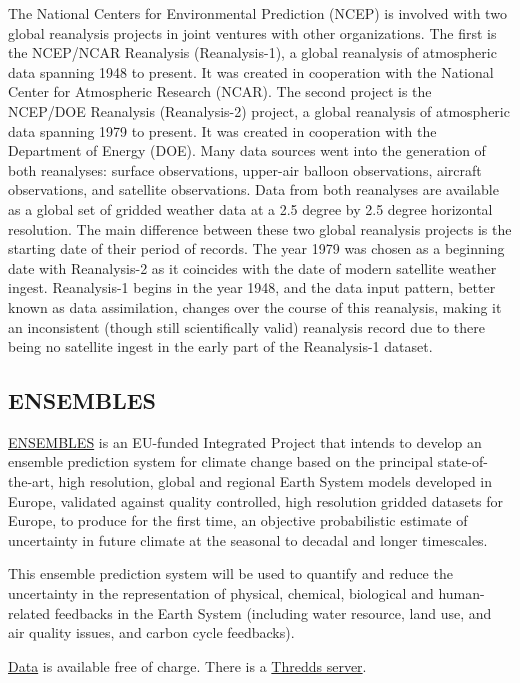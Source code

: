 \documentclass[11pt]{article}
\begin{document}
The National Centers for Environmental Prediction (NCEP) is
involved with two global reanalysis projects in joint ventures
with other organizations. The first is the NCEP/NCAR Reanalysis
(Reanalysis-1), a global reanalysis of atmospheric data spanning
1948 to present. It was created in cooperation with the National
Center for Atmospheric Research (NCAR). The second project is the
NCEP/DOE Reanalysis (Reanalysis-2) project, a global reanalysis of
atmospheric data spanning 1979 to present. It was created in
cooperation with the Department of Energy (DOE). Many data sources
went into the generation of both reanalyses: surface observations,
upper-air balloon observations, aircraft observations, and
satellite observations. Data from both reanalyses are available as
a global set of gridded weather data at a 2.5 degree by 2.5 degree
horizontal resolution. The main difference between these two
global reanalysis projects is the starting date of their period of
records. The year 1979 was chosen as a beginning date with
Reanalysis-2 as it coincides with the date of modern satellite
weather ingest. Reanalysis-1 begins in the year 1948, and the data
input pattern, better known as data assimilation, changes over the
course of this reanalysis, making it an inconsistent (though still
scientifically valid) reanalysis record due to there being no
satellite ingest in the early part of the Reanalysis-1 dataset.

\subsection{ENSEMBLES}
\label{sec-3-2}

\href{//old.ecmwf.int/research/EU_projects/ENSEMBLES/index.html}{ENSEMBLES} is an EU-funded Integrated Project that intends to
develop an ensemble prediction system for climate change based on
the principal state-of-the-art, high resolution, global and
regional Earth System models developed in Europe, validated
against quality controlled, high resolution gridded datasets for
Europe, to produce for the first time, an objective probabilistic
estimate of uncertainty in future climate at the seasonal to
decadal and longer timescales.

This ensemble prediction system will be used to quantify and
reduce the uncertainty in the representation of physical,
chemical, biological and human-related feedbacks in the Earth
System (including water resource, land use, and air quality
issues, and carbon cycle feedbacks). 

\href{http://old.ecmwf.int/research/EU_projects/ENSEMBLES/data/data_dissemination.htmlhttp://www.ecmwf.int/research/EU_projects/ENSEMBLES/data/data_dissemination.html}{Data} is available free of charge. There is a \href{http://ensembles.ecmwf.int/thredds/catalog.html}{Thredds server}.
\end{document}
